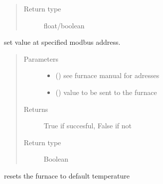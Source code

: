 \documentclass[letterpaper,10pt,english]{sphinxmanual}
\begin{document}
\begin{fulllineitems}
\begin{fulllineitems}
\begin{quote}
\begin{description}
\item[{Return type}] \leavevmode
float/boolean

\end{description}\end{quote}

\end{fulllineitems}


\begin{fulllineitems}
\label{\detokenize{drivers:drivers.Furnace.other}}
set value at specified modbus address.
\begin{quote}\begin{description}
\item[{Parameters}] \leavevmode\begin{itemize}
\item {} 
 (\sphinxstyleliteralemphasis{\sphinxupquote{, }}) \textendash{} see furnace manual for adresses

\item {} 
 (\sphinxstyleliteralemphasis{\sphinxupquote{, }}) \textendash{} value to be sent to the furnace

\end{itemize}

\item[{Returns}] \leavevmode
True if succesful, False if not

\item[{Return type}] \leavevmode
Boolean

\end{description}\end{quote}

\end{fulllineitems}


\begin{fulllineitems}
\label{\detokenize{drivers:drivers.Furnace.reset}}
resets the furnace to default temperature


\end{fulllineitems}
\end{fulllineitems}
\end{document}
